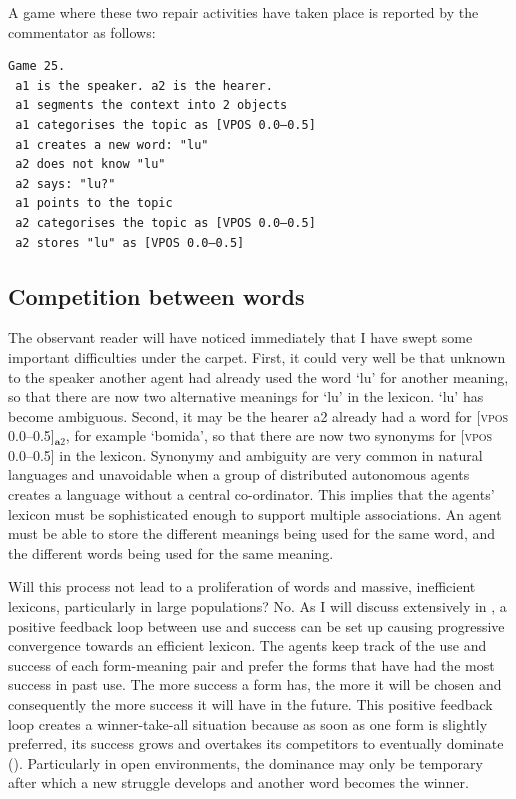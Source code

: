 A game where these two repair activities have taken
place is reported by the commentator as follows: 
\begin{verbatim}
Game 25.
 a1 is the speaker. a2 is the hearer. 
 a1 segments the context into 2 objects
 a1 categorises the topic as [VPOS 0.0–0.5]
 a1 creates a new word: "lu"
 a2 does not know "lu"
 a2 says: "lu?"
 a1 points to the topic 
 a2 categorises the topic as [VPOS 0.0–0.5]
 a2 stores "lu" as [VPOS 0.0–0.5]
\end{verbatim}

\subsection{Competition between words}

The observant reader will have noticed immediately that 
I have swept some important difficulties under the carpet. 
First, it could very well be that unknown to the speaker 
another agent had already used the word `lu' 
for another meaning, so that there are now 
two alternative meanings for `lu' in the lexicon. `lu' 
has become ambiguous. Second, it may be the hearer {\bfshape a2} already 
had a word for [\textsc{vpos} 0.0–0.5]$_{\mathbf  a2}$, for example `bomida', 
so that there are now two synonyms for [\textsc{vpos} 0.0–0.5] in the lexicon. 
Synonymy and ambiguity are very common in 
natural languages and unavoidable when a group of 
distributed autonomous agents creates a language without
a central co-ordinator. This implies that 
the agents' lexicon must be sophisticated enough 
to support multiple associations. An agent must be able to 
store the different meanings being used for the same word, and the 
different words being used for the same meaning. 

Will this process not lead to a proliferation of words and 
massive, inefficient lexicons, particularly in large
populations? No. As I will discuss extensively 
in , a positive feedback 
loop between use and success
can be set up causing progressive convergence towards an 
efficient lexicon. The agents keep track of the use and 
success of each form-meaning pair and prefer the forms that have had
the most success in past use. The more success a form has, the more
it will be chosen 
and consequently the more success it will have in the 
future. This positive feedback loop creates a winner-take-all 
situation because as soon as one form is slightly preferred, 
its success grows and overtakes its competitors
to eventually dominate (). Particularly 
in open environments, the dominance may only be temporary 
after which a new struggle develops and another word 
becomes the winner. 

